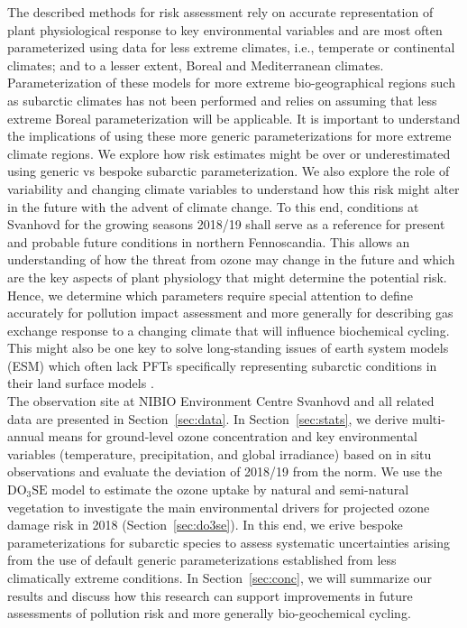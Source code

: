 \documentclass[bg, manuscript]{copernicus}
\begin{document}
The described methods for risk assessment rely on accurate representation of plant physiological response to key environmental variables and are most often parameterized using data for less extreme climates, i.e., temperate or continental climates; and to a lesser extent, Boreal and Mediterranean climates. Parameterization of these models for more extreme bio-geographical regions such as subarctic climates has not been performed and relies on assuming that less extreme Boreal parameterization will be applicable. It is important to understand the implications of using these more generic parameterizations for more extreme climate regions. We explore how risk estimates might be over or underestimated using generic vs bespoke subarctic parameterization. We also explore the role of \chem{[O_3]} variability and changing climate variables to understand how this risk might alter in the future with the advent of climate change. To this end, conditions at Svanhovd for the growing seasons 2018/19 shall serve as a reference for present and probable future conditions in northern Fennoscandia.
This allows an understanding of how the threat from ozone may change in the future and which are the key aspects of plant physiology that might determine the potential risk. Hence, we determine which parameters require special attention to define accurately for pollution impact assessment and more generally for describing gas exchange response to a changing climate that will influence biochemical cycling. This might also be one key to solve long-standing issues of earth system models (ESM) which often lack PFTs specifically representing subarctic conditions in their land surface models \citep{GMD:Poulter2015,JAMES:Lawrence2019}.\\

The observation site at NIBIO Environment Centre Svanhovd and all related data are presented in Section~\ref{sec:data}. In Section~\ref{sec:stats}, we derive multi-annual means for ground-level ozone concentration and key environmental variables (temperature, precipitation, and global irradiance) based on in situ observations and evaluate the deviation of 2018/19 from the norm. We use the $\mathrm{DO_3SE}$ model to estimate the ozone uptake by natural and semi-natural vegetation to investigate the main environmental drivers for projected ozone damage risk in 2018 (Section~\ref{sec:do3se}). In this end, we erive bespoke parameterizations for subarctic species to assess systematic uncertainties arising from the use of default generic parameterizations established from less climatically extreme conditions. In Section~\ref{sec:conc}, we will summarize our results and discuss how this research can support improvements in future assessments of pollution risk and more generally bio-geochemical cycling.
\end{document}
